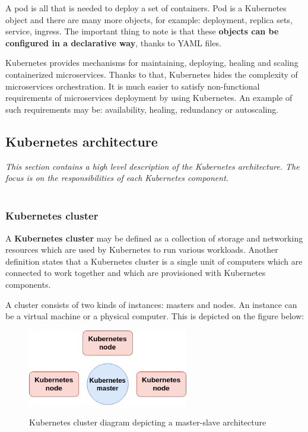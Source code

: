 A pod is all that is needed to deploy a set of containers. Pod is a Kubernetes object and there are many more objects, for example: deployment, replica sets, service, ingress. The important thing to note is that these \textbf{objects can be configured in a declarative way}, thanks to YAML files\cite{k8s-declarative}.

Kubernetes provides mechanisms for maintaining, deploying, healing and scaling containerized microservices. Thanks to that, Kubernetes hides the complexity of microservices orchestration. It is much easier to satisfy non-functional requirements of microservices deployment by using Kubernetes. An example of such requirements may be: availability, healing, redundancy or autoscaling\cite{article-k8s-as-avail}.

\subsection{Kubernetes architecture}
\textit{This section contains a high level description of the Kubernetes architecture. The focus is on the responsibilities of each Kubernetes component.}
~\\
~\\
\subsubsection{Kubernetes cluster}
A \textbf{Kubernetes cluster} may be defined as a collection of storage and networking resources which are used by Kubernetes to run various workloads\cite{book-mastering-k8s}. Another definition states that a Kubernetes cluster is a single unit of computers which are connected to work together and which are provisioned with Kubernetes components\cite{k8s-cluster}.

A cluster consists of two kinds of instances: masters and nodes. An instance can be a virtual machine or a physical computer\cite{k8s-cluster}\cite{article-k8s-as-avail}. This is depicted on the figure below:
\begin{figure}[H]
    \centering
    \includegraphics[width=7cm]{figures/cluster-k8s.png}
    \label{fig:cluster}\
    \caption{Kubernetes cluster diagram depicting a master-slave architecture}
\end{figure}

